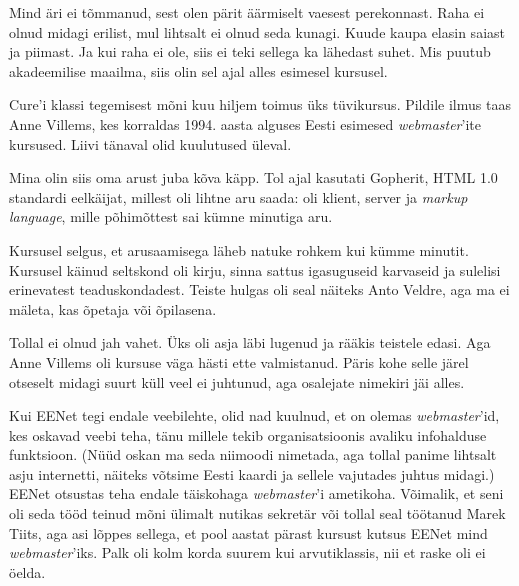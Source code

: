 
Mind äri ei tõmmanud, sest olen pärit äärmiselt vaesest perekonnast. Raha ei 
olnud midagi erilist, mul lihtsalt ei olnud seda kunagi. Kuude kaupa elasin saiast ja piimast. Ja kui raha ei ole, siis ei teki sellega ka lähedast 
suhet. Mis puutub akadeemilise maailma, siis olin sel ajal
alles esimesel kursusel.

Cure'i klassi tegemisest mõni kuu hiljem toimus üks tüvikursus. Pildile ilmus taas Anne Villems, kes korraldas 1994. aasta alguses Eesti esimesed \emph{webmaster}'ite kursused. 
Liivi tänaval olid kuulutused üleval.

Mina olin siis oma arust juba kõva käpp. 
Tol ajal kasutati Gopherit, HTML 1.0 standardi eelkäijat, millest oli lihtne aru saada: oli klient, server ja \emph{markup language}, mille 
põhimõttest sai kümne minutiga aru.

Kursusel selgus, et arusaamisega läheb natuke 
rohkem kui kümme minutit. Kursusel käinud seltskond oli 
kirju, sinna sattus igasuguseid karvaseid ja sulelisi erinevatest 
teaduskondadest. Teiste hulgas oli seal näiteks Anto Veldre, aga 
ma ei mäleta, kas õpetaja või õpilasena.


Tollal ei olnud jah vahet. Üks oli asja läbi lugenud ja rääkis teistele 
edasi. Aga Anne Villems oli kursuse väga hästi ette valmistanud. Päris kohe selle järel otseselt midagi suurt küll veel ei juhtunud, aga osalejate nimekiri jäi alles. 

Kui EENet tegi endale veebilehte, olid nad kuulnud, et on olemas
\emph{webmaster}'id, kes oskavad veebi teha, tänu millele tekib organisatsioonis 
avaliku infohalduse funktsioon. (Nüüd oskan ma seda niimoodi nimetada, aga 
tollal panime lihtsalt asju internetti, näiteks 
võtsime Eesti kaardi ja sellele vajutades juhtus midagi.) EENet otsustas teha endale täiskohaga \emph{webmaster}'i ametikoha. Võimalik, et seni oli seda tööd teinud mõni ülimalt nutikas 
sekretär või tollal seal töötanud Marek 
Tiits, aga 
asi lõppes sellega, et pool aastat pärast kursust kutsus EENet mind
\emph{webmaster}'iks. Palk oli kolm korda suurem kui arvutiklassis, nii et raske oli ei öelda.

